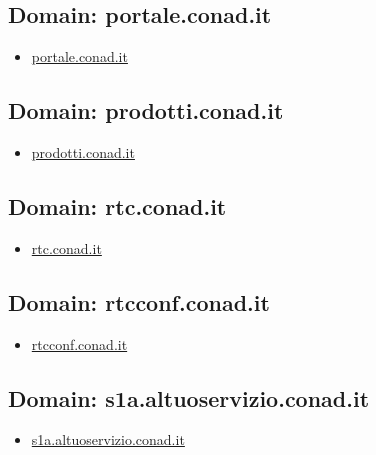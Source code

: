 \documentclass{article}
\begin{document}
    \subsection{Domain: portale.conad.it}
    \begin{itemize}
        
            
            \item \href{ https://portale.conad.it/my.policy}{ portale.conad.it }
            
        
    \end{itemize}

    \subsection{Domain: prodotti.conad.it}
    \begin{itemize}
        
            
            \item \href{ http://prodotti.conad.it/}{ prodotti.conad.it }
            
        
    \end{itemize}

    \subsection{Domain: rtc.conad.it}
    \begin{itemize}
        
            
            \item \href{ http://rtc.conad.it}{ rtc.conad.it }
            
        
    \end{itemize}

    \subsection{Domain: rtcconf.conad.it}
    \begin{itemize}
        
            
            \item \href{ http://rtcconf.conad.it}{ rtcconf.conad.it }
            
        
    \end{itemize}

    \subsection{Domain: s1a.altuoservizio.conad.it}
    \begin{itemize}
        
            
            \item \href{ https://s1a.altuoservizio.conad.it/chiusuratemporanea.html}{ s1a.altuoservizio.conad.it }
            
        
    \end{itemize}
\end{document}
